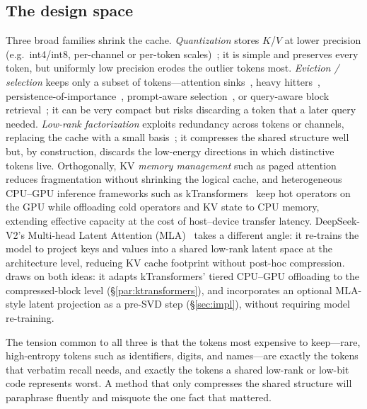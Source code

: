 \subsection{The design space}
Three broad families shrink the cache. \emph{Quantization} stores $K$/$V$ at lower precision
(e.g.\ int4/int8, per-channel or per-token scales)~\cite{liu2024kivi}; it is simple and preserves
every token, but uniformly low precision erodes the outlier tokens most. \emph{Eviction /
selection} keeps only a subset of tokens---attention sinks~\cite{xiao2024streamingllm}, heavy
hitters~\cite{zhang2023h2o}, persistence-of-importance~\cite{liu2023scissorhands}, prompt-aware
selection~\cite{li2024snapkv}, or query-aware block retrieval~\cite{tang2024quest}; it can be very
compact but risks discarding a token that a later query needed. \emph{Low-rank factorization}
exploits redundancy across tokens or channels, replacing the cache with a small
basis~\cite{deepseekv2,dong2024less}; it compresses the shared structure well but, by construction,
discards the low-energy directions in which distinctive tokens live. Orthogonally, KV \emph{memory
management} such as paged attention~\cite{kwon2023vllm} reduces fragmentation without shrinking the
logical cache, and heterogeneous CPU--GPU inference frameworks such as
kTransformers~\cite{yang2025ktransformers} keep hot operators on the GPU while offloading cold
operators and KV state to CPU memory, extending effective capacity at the cost of host--device
transfer latency. DeepSeek-V2's Multi-head Latent Attention (MLA)~\cite{deepseekv2} takes
a different angle: it re-trains the model to project keys and values into a shared low-rank latent
space at the architecture level, reducing KV cache footprint without post-hoc compression. \dkv{}
draws on both ideas: it adapts kTransformers' tiered CPU--GPU offloading to the compressed-block
level (\S\ref{par:ktransformers}), and incorporates an optional MLA-style latent projection as a
pre-SVD step (\S\ref{sec:impl}), without requiring model re-training.

The tension common to all three is that the tokens most expensive to keep---rare, high-entropy
tokens such as identifiers, digits, and names---are exactly the tokens that verbatim recall
needs, and exactly the tokens a shared low-rank or low-bit code represents worst. A method that
only compresses the shared structure will paraphrase fluently and misquote the one fact that
mattered.

